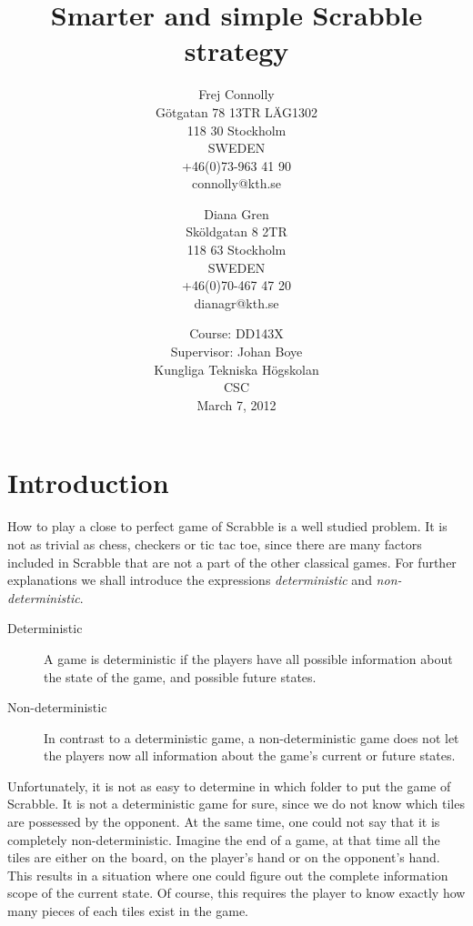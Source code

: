 \documentclass[a4paper, 12pt]{report}
\begin{document}
\title{Smarter and simple Scrabble strategy}
\date{Course: DD143X \\ Supervisor: Johan Boye \\ Kungliga Tekniska Högskolan \\ CSC \\ March 7, 2012}
\author{Frej Connolly \\ Götgatan 78 13TR LÄG1302 \\ 118 30 Stockholm \\ SWEDEN \\ +46(0)73-963 41 90 \\ connolly@kth.se \\
        \and Diana Gren \\ Sköldgatan 8 2TR \\ 118 63 Stockholm \\ SWEDEN \\ +46(0)70-467 47 20 \\ dianagr@kth.se}

\maketitle
\tableofcontents

\chapter{Introduction}
How to play a close to perfect game of Scrabble is a well studied problem. It is not as trivial as chess, checkers or tic tac toe, since there are many factors included in Scrabble that are not a part of the other classical games. For further explanations we shall introduce the expressions \emph{deterministic} and \emph{non-deterministic}. 

\begin{description}
\item[Deterministic] A game is deterministic if the players have all possible information about the state of the game, and possible future states.
\item[Non-deterministic] In contrast to a deterministic game, a non-deterministic game does not let the players now all information about the game's current or future states.
\end{description}

Unfortunately, it is not as easy to determine in which folder to put the game of Scrabble. It is not a deterministic game for sure, since we do not know which tiles are possessed by the opponent. At the same time, one could not say that it is completely non-deterministic. Imagine the end of a game, at that time all the tiles are either on the board, on the player's hand or on the opponent's hand. This results in a situation where one could figure out the complete information scope of the current state. Of course, this requires the player to know exactly how many pieces of each tiles exist in the game.
\end{document}
